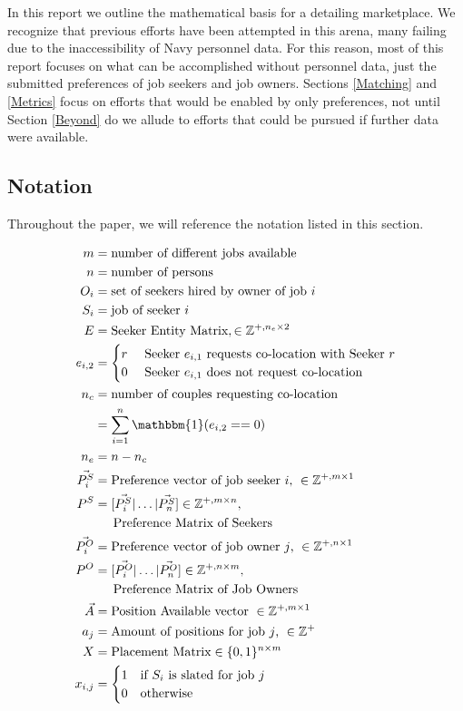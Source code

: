 In this report we outline the mathematical basis for a detailing marketplace. We recognize that previous efforts have been attempted in this arena, many failing due to the inaccessibility of Navy personnel data. For this reason, most of this report focuses on what can be accomplished without personnel data, just the submitted preferences of job seekers and job owners.  Sections \ref{Matching} and \ref{Metrics} focus on efforts that would be enabled by only preferences, not until Section \ref{Beyond} do we allude to efforts that could be pursued if further data were available.

\subsection{Notation}

Throughout the paper, we will reference the notation listed in this section.

\begin{align}
m &= \text{number of different jobs available}\\
n &= \text{number of persons}\\
O_i &= \text{set of seekers hired by owner of job $i$} \\
S_i &= \text{job of seeker $i$} \\
E &= \text{Seeker Entity Matrix}, \in \mathbb{Z}^{+, n_e \times 2}\\
e_{i,2} &= \begin{cases}
r & \text{ Seeker $e_{i,1}$ requests co-location with Seeker $r$} \\
0 & \text{ Seeker $e_{i,1}$ does not request co-location}
\end{cases} \\
n_c &= \text{number of couples requesting co-location}\\
&= \sum_{i=1}^n\mathbbm{1}(e_{i,2} == 0) \\
n_e &= n - n_c \\
\vec{P^S_i} &= \text{Preference vector of job seeker $i$, } \in \mathbb{Z}^{+, m \times 1} \\
P^S &= [\vec{P^S_i} | \dots | \vec{P^S_n}] \in \mathbb{Z}^{+, m \times n}, \\ 
&\text{\indent Preference Matrix of Seekers} \\
\vec{P^O_i} &= \text{Preference vector of job owner $j$, } \in \mathbb{Z}^{+, n \times 1} \\
P^O &= [\vec{P^O_i} | \dots | \vec{P^O_n}] \in \mathbb{Z}^{+, n \times m}, \\ 
&\text{\indent Preference Matrix of Job Owners} \\
\vec{A} &= \text{Position Available vector }\in \mathbb{Z}^{+, m \times 1} \\
a_j &= \text{Amount of positions for job $j$, } \in \mathbb{Z}^{+} \\
X &= \text{Placement Matrix} \in \{0,1\}^{n \times m} \\
x_{i,j} &= \begin{cases}
1 & \text{if $S_i$ is slated for job $j$}\\
0 & \text{otherwise}
\end{cases}
\end{align}

